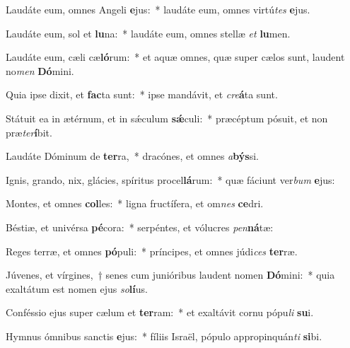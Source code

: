 \item Laudáte eum, omnes Angeli \textbf{e}jus:~* laudáte eum, omnes virtú\textit{tes} \textbf{e}jus.
\item Laudáte eum, sol et \textbf{lu}na:~* laudáte eum, omnes stellæ \textit{et} \textbf{lu}men.
\item Laudáte eum, cæli cæ\textbf{ló}rum:~* et aquæ omnes, quæ super cælos sunt, laudent no\textit{men} \textbf{Dó}mini.
\item Quia ipse dixit, et \textbf{fac}ta sunt:~* ipse mandávit, et \textit{cre}\textbf{á}ta sunt.
\item Státuit ea in ætérnum, et in sǽculum \textbf{sǽ}culi:~* præcéptum pósuit, et non præ\textit{ter}\textbf{í}bit.
\item Laudáte Dóminum de \textbf{ter}ra,~* dracónes, et omnes \textit{a}\textbf{býs}si.
\item Ignis, grando, nix, glácies, spíritus procel\textbf{lá}rum:~* quæ fáciunt ver\textit{bum} \textbf{e}jus:
\item Montes, et omnes \textbf{col}les:~* ligna fructífera, et om\textit{nes} \textbf{ce}dri.
\item Béstiæ, et univérsa \textbf{pé}cora:~* serpéntes, et vólucres \textit{pen}\textbf{ná}tæ:
\item Reges terræ, et omnes \textbf{pó}puli:~* príncipes, et omnes júdi\textit{ces} \textbf{ter}ræ.
\item Júvenes, et vírgines,~† senes cum junióribus laudent nomen \textbf{Dó}mini:~* quia exaltátum est nomen ejus \textit{so}\textbf{lí}us.
\item Conféssio ejus super cælum et \textbf{ter}ram:~* et exaltávit cornu pópu\textit{li} \textbf{su}i.
\item Hymnus ómnibus sanctis \textbf{e}jus:~* fíliis Israël, pópulo appropinquán\textit{ti} \textbf{si}bi.
